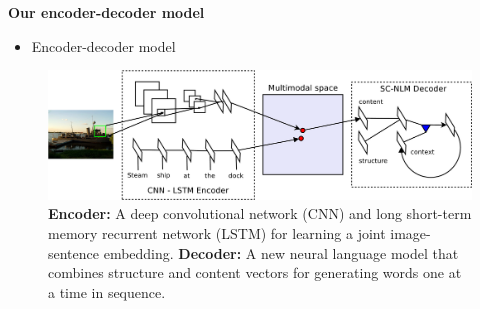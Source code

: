 \documentclass[serif,mathserif,final]{beamer}
\begin{document}
\begin{frame}{}
\begin{columns}[t]
\begin{column}{0.32\linewidth}
\begin{block}{\bf{\large Our encoder-decoder model}}
  \begin{itemize}
  \item Encoder-decoder model
  \end{itemize}
  \begin{figure}[t!]
    \centering
    \includegraphics[width=0.9\columnwidth]{encdec2}
    \caption{\textbf{Encoder:} A deep convolutional network (CNN) and long
      short-term memory recurrent network (LSTM) for learning a joint
      image-sentence embedding. \textbf{Decoder:} A new neural language model that
      combines structure and content vectors for generating words one at a time in
      sequence.} 
    \label{fig:annot2}
  \end{figure}
\end{block}
\vfill


\end{column}
\end{columns}
\end{frame}
\end{document}
